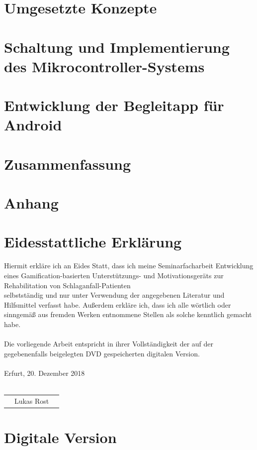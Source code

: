 \documentclass[a4paper, 11pt, titlepage, bibliography=totocnumbered]{scrartcl}
\begin{document}
\newpage
\section{Umgesetzte Konzepte}


\newpage
\section{Schaltung und Implementierung des Mikrocontroller-Systems}


\newpage
\section{Entwicklung der Begleitapp für Android}


\newpage
\section{Zusammenfassung}


\newpage


\newpage
\section{Anhang}


\newpage
\section*{Eidesstattliche Erklärung}
Hiermit erkläre ich an Eides Statt, dass ich meine Seminarfacharbeit \glqq Entwicklung eines Gamification-basierten Unterstützungs- und Motivationsgeräts zur Rehabilitation von Schlaganfall-Patienten\grqq ~ \\ selbstständig und nur unter Verwendung der angegebenen Literatur und Hilfsmittel verfasst habe. Außerdem erkläre ich, dass ich alle wörtlich oder sinngemäß aus fremden Werken entnommene Stellen als solche kenntlich gemacht habe.\\ \\
Die vorliegende Arbeit entspricht in ihrer Vollständigkeit der auf der gegebenenfalls beigelegten DVD gespeicherten digitalen Version.
\\ \\
Erfurt, 20. Dezember 2018
\\ \\
\begin{center}
\begin{tabular}{@{}l@{}}\hline
$\: \: \:$ Lukas Rost $\: \: \:$
\end{tabular}
\end{center}

\newpage
\section*{Digitale Version}
\vspace{2cm}
\hspace{0.5cm}
\end{document}
